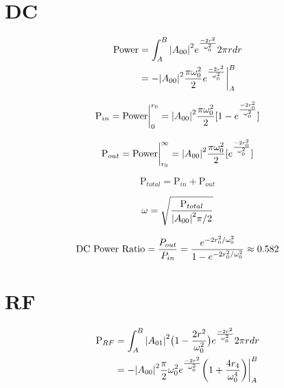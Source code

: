 \begin{appendices}
	\section{DC}
	\begin{equation}
	\begin{split}
	\text{Power} &= \int_{A}^{B} \abs{A_{00}}^2e^{\frac{-2r^2}{\omega_{0}^2}} 2\pi r dr\\
			&= -\abs{A_{00}}^2 \frac{\pi \omega_{0}^2}{2} e^{\frac{-2r^2}{\omega_{0}^2}} \biggr\rvert_A^B
	\end{split}
	\end{equation}
	
	\begin{equation}
	\text{P}_{in} = \text{Power} \biggr\rvert_0^{r_0} = \abs{A_{00}}^2 \frac{\pi \omega_{0}^2}{2} [1 - e^{\frac{-2r_0^2}{\omega_{0}^2}}]
	\end{equation}
	
	\begin{equation}
	\text{P}_{out} = \text{Power} \biggr\rvert_{r_0}^{\infty} = \abs{A_{00}}^2 \frac{\pi \omega_{0}^2}{2} [e^{\frac{-2r_0^2}{\omega_{0}^2}}]
	\end{equation}
	
	\begin{equation}
	\text{P}_{total} =  \text{P}_{in} + \text{P}_{out}
	\end{equation}
	
	\begin{equation}
	\omega = \sqrt{\frac{\text{P}_{total}}{\abs{A_{00}}^2 \pi / 2}}
	\end{equation}
	
	\begin{equation}
	\text{DC Power Ratio} 
	= \frac{P_{out}}{P_{in}} \\
	= \frac{e^{-2r_0^2/ \omega_{0}^2}} {1 - e^{-2r_0^2/ \omega_{0}^2 }} \approx 0.582
	\end{equation}
	
	\section{RF}
	
	\begin{equation}
	\begin{split}
	\text{P}_{RF} &= \int_{A}^{B} \abs{A_{01}}^2 \big(1-\frac{2r^2}{\omega_{0}^2}\big) e^{\frac{-2r^2}{\omega_{0}^2}} 2\pi r dr\\
	&= -\abs{A_{00}}^2 \frac{\pi}{2} \omega_{0}^2 e^{\frac{-2r^2}{\omega_{0}^2}} \bigg(1 + \frac{4 r_4}{\omega_{0}^4} \bigg)  \biggr\rvert_A^B
	\end{split}
	\end{equation}
	

\end{appendices}
